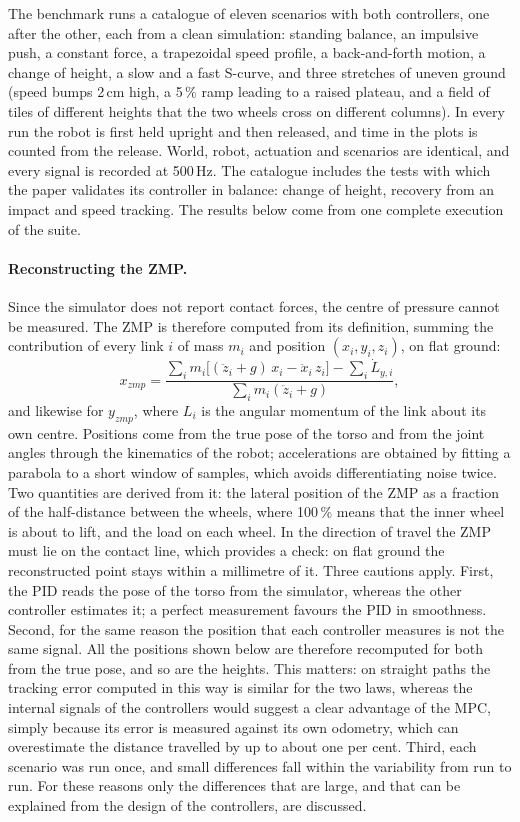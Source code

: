 \documentclass[11pt,a4paper]{article}
\begin{document}
The benchmark runs a catalogue of eleven scenarios with both controllers, one after the other, each from a clean
simulation: standing balance, an impulsive push, a constant force, a trapezoidal speed profile, a back-and-forth
motion, a change of height, a slow and a fast S-curve, and three stretches of uneven ground (speed bumps 2\,cm high, a
5\,\% ramp leading to a raised plateau, and a field of tiles of different heights that the two wheels cross on
different columns). In every run the robot is first held upright and then released, and time in the plots
is counted from the release. World, robot,
actuation and scenarios are identical, and every signal is recorded at 500\,Hz. The catalogue includes the tests with which the paper validates its controller in balance: change of height, recovery
from an impact and speed tracking. The
results below come from one complete execution of the suite.

\paragraph{Reconstructing the ZMP.} Since the simulator does not report contact forces, the centre of pressure
cannot be measured. The ZMP is therefore computed from its definition, summing the contribution of every link $i$ of
mass $m_i$ and position $(x_i,y_i,z_i)$, on flat ground:
\begin{equation}
  x_{zmp}=\frac{\sum_i m_i\big[(\ddot z_i+g)\,x_i-\ddot x_i\,z_i\big]-\sum_i\dot L_{y,i}}{\sum_i m_i(\ddot z_i+g)},
  \label{eq:zmp}
\end{equation}
and likewise for $y_{zmp}$, where $L_i$ is the angular momentum of the link about its own centre. Positions come
from the true pose of the torso and from the joint angles through the kinematics of the robot; accelerations are
obtained by fitting a parabola to a short window of samples, which avoids differentiating noise twice. Two
quantities are derived from it: the lateral position of the
ZMP as a fraction of the half-distance between the wheels, where 100\,\% means that the inner wheel is about to lift,
and the load on each wheel. In the direction of travel the ZMP must lie on the contact line, which provides a
check: on flat ground the reconstructed point stays within a millimetre of it.
Three cautions apply. First, the PID reads the pose of the torso from the
simulator, whereas the other controller estimates it; a perfect measurement favours the PID in smoothness. Second,
for the same reason the position that each controller measures is not the same signal. All the positions shown below
are therefore recomputed for both from the true pose, and so are the heights. This matters: on
straight paths the tracking error computed in this way is similar for the two laws, whereas the internal signals of
the controllers would suggest a clear advantage of the MPC, simply because its error is measured against its own odometry, which
can overestimate the distance travelled by up to about one per cent. Third, each scenario was run once, and small
differences fall within the variability from run to run. For these reasons only the differences that are large, and
that can be explained from the design of the controllers, are discussed.
\end{document}
